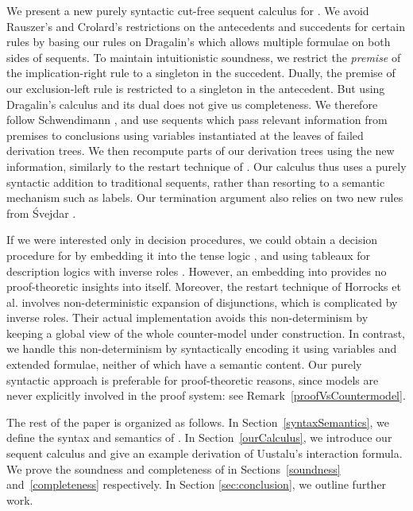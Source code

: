 \documentclass{llncs}
\numberwithin{equation}{section}
\begin{document}
We present a new purely syntactic cut-free sequent calculus for
. We avoid
Rauszer's and Crolard's restrictions on the 
antecedents and succedents for certain rules by basing our rules on
Dragalin's  \cite{dragalin1988} which allows multiple formulae
on both sides of sequents. To maintain intuitionistic soundness, we
restrict 
the \emph{premise} of the implication-right
rule
to a singleton in the succedent. Dually, the
premise of our exclusion-left rule is restricted to a singleton in the
antecedent.
But using Dragalin's calculus and its dual does not give us
 completeness. We therefore follow Schwendimann
\cite{schwendimann98}, and use sequents which pass relevant
information from premises to conclusions using variables instantiated
at the leaves of failed derivation trees. We then recompute parts of our derivation trees using the new information, similarly to the restart technique of \cite{horrocks1998}. Our calculus thus uses a
purely syntactic addition to traditional sequents, rather than resorting to a semantic
mechanism such as labels. Our termination argument also relies on two
new rules from \'{S}vejdar \cite{svejdar2006}.

If we were interested only in decision procedures, we could obtain a decision procedure for  by embedding it
into the tense logic  \cite{wolter98}, and using tableaux for description logics with inverse roles 
\cite{horrocks1998}. However, an embedding into  provides no proof-theoretic insights into  itself. Moreover, the restart technique of Horrocks et al. \cite{horrocks1998} involves
non-deterministic expansion of disjunctions, which is complicated by
inverse roles. Their actual implementation avoids this non-determinism by keeping a global view of the whole counter-model under construction. In contrast, we handle this non-determinism by syntactically encoding it using variables and extended formulae, neither of which have a semantic content. Our purely syntactic approach is preferable for proof-theoretic reasons, since models are never explicitly involved in the proof system: see Remark~\ref{proofVsCountermodel}.

The rest of the paper is organized as follows. In Section~\ref{syntaxSemantics}, we define the syntax and semantics
of .  In Section~\ref{ourCalculus}, we introduce our sequent calculus  and give an example derivation of Uustalu's interaction formula. We prove the soundness and completeness of  in Sections~\ref{soundness}
and~\ref{completeness} respectively.  In Section \ref{sec:conclusion}, we outline further work.
\end{document}
